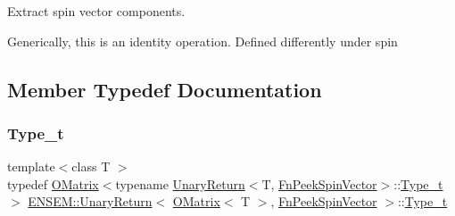 Extract spin vector components. 

Generically, this is an identity operation. Defined differently under spin 

\subsection{Member Typedef Documentation}
\mbox{\label{structENSEM_1_1UnaryReturn_3_01OMatrix_3_01T_01_4_00_01FnPeekSpinVector_01_4_a995bd2c849af30377b0fa17937b63f19}} 
\subsubsection{\texorpdfstring{Type\_t}{Type\_t}\hspace{0.1cm}{\footnotesize\ttfamily [1/2]}}
{\footnotesize\ttfamily template$<$class T $>$ \\
typedef \mbox{\hyperlink{classENSEM_1_1OMatrix}{O\+Matrix}}$<$typename \mbox{\hyperlink{structENSEM_1_1UnaryReturn}{Unary\+Return}}$<$T, \mbox{\hyperlink{structENSEM_1_1FnPeekSpinVector}{Fn\+Peek\+Spin\+Vector}}$>$\+::\mbox{\hyperlink{structENSEM_1_1UnaryReturn_3_01OMatrix_3_01T_01_4_00_01FnPeekSpinVector_01_4_a995bd2c849af30377b0fa17937b63f19}{Type\+\_\+t}}$>$ \mbox{\hyperlink{structENSEM_1_1UnaryReturn}{E\+N\+S\+E\+M\+::\+Unary\+Return}}$<$ \mbox{\hyperlink{classENSEM_1_1OMatrix}{O\+Matrix}}$<$ T $>$, \mbox{\hyperlink{structENSEM_1_1FnPeekSpinVector}{Fn\+Peek\+Spin\+Vector}} $>$\+::\mbox{\hyperlink{structENSEM_1_1UnaryReturn_3_01OMatrix_3_01T_01_4_00_01FnPeekSpinVector_01_4_a995bd2c849af30377b0fa17937b63f19}{Type\+\_\+t}}}

\mbox{\label{structENSEM_1_1UnaryReturn_3_01OMatrix_3_01T_01_4_00_01FnPeekSpinVector_01_4_a995bd2c849af30377b0fa17937b63f19}} 
